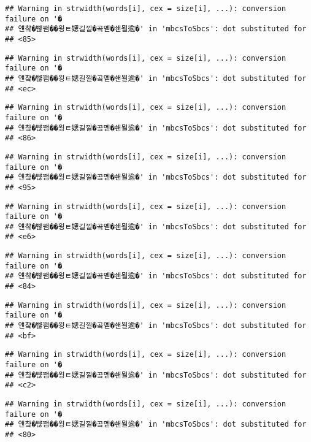 \documentclass[]{article}
\begin{document}
\begin{verbatim}
## Warning in strwidth(words[i], cex = size[i], ...): conversion failure on '�
## 얜챸�뺞꽴��욍ㅌ媤길낄�곸몓�쇈묄逾�' in 'mbcsToSbcs': dot substituted for
## <85>
\end{verbatim}

\begin{verbatim}
## Warning in strwidth(words[i], cex = size[i], ...): conversion failure on '�
## 얜챸�뺞꽴��욍ㅌ媤길낄�곸몓�쇈묄逾�' in 'mbcsToSbcs': dot substituted for
## <ec>
\end{verbatim}

\begin{verbatim}
## Warning in strwidth(words[i], cex = size[i], ...): conversion failure on '�
## 얜챸�뺞꽴��욍ㅌ媤길낄�곸몓�쇈묄逾�' in 'mbcsToSbcs': dot substituted for
## <86>
\end{verbatim}

\begin{verbatim}
## Warning in strwidth(words[i], cex = size[i], ...): conversion failure on '�
## 얜챸�뺞꽴��욍ㅌ媤길낄�곸몓�쇈묄逾�' in 'mbcsToSbcs': dot substituted for
## <95>
\end{verbatim}

\begin{verbatim}
## Warning in strwidth(words[i], cex = size[i], ...): conversion failure on '�
## 얜챸�뺞꽴��욍ㅌ媤길낄�곸몓�쇈묄逾�' in 'mbcsToSbcs': dot substituted for
## <e6>
\end{verbatim}

\begin{verbatim}
## Warning in strwidth(words[i], cex = size[i], ...): conversion failure on '�
## 얜챸�뺞꽴��욍ㅌ媤길낄�곸몓�쇈묄逾�' in 'mbcsToSbcs': dot substituted for
## <84>
\end{verbatim}

\begin{verbatim}
## Warning in strwidth(words[i], cex = size[i], ...): conversion failure on '�
## 얜챸�뺞꽴��욍ㅌ媤길낄�곸몓�쇈묄逾�' in 'mbcsToSbcs': dot substituted for
## <bf>
\end{verbatim}

\begin{verbatim}
## Warning in strwidth(words[i], cex = size[i], ...): conversion failure on '�
## 얜챸�뺞꽴��욍ㅌ媤길낄�곸몓�쇈묄逾�' in 'mbcsToSbcs': dot substituted for
## <c2>
\end{verbatim}

\begin{verbatim}
## Warning in strwidth(words[i], cex = size[i], ...): conversion failure on '�
## 얜챸�뺞꽴��욍ㅌ媤길낄�곸몓�쇈묄逾�' in 'mbcsToSbcs': dot substituted for
## <80>
\end{verbatim}
\end{document}
